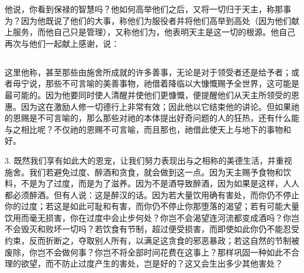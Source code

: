他说，你看到保禄的智慧吗？他如何高举他们之后，又将一切归于天主，称那事为？因为他既说了他们的大事，称他们为服役者并将他们高举到高处（因为他们献上服务，而他自己只是管理），又称他们为，他表明天主是这一切的根源。他自己再次与他们一起献上感谢，说：\par


\subsection{}

\par

这里他称，甚至那些由施舍所成就的许多善事，无论是对于领受者还是给予者；或者毋宁说，那些不可言喻的美善事物，祂借着降临以大慷慨赐予全世界，这可能是最可能的。因为他要同时使人清醒并使他们更慷慨，便提醒他们从天主所领受的恩惠。因为这在激励人修一切德行上非常有效；因此他以它结束他的讲论。但如果祂的恩赐是不可言喻的，那么那些对祂的本体提出好奇问题的人的狂热，还有什么能与之相比呢？不仅祂的恩赐不可言喻，而且那也，祂借此使天上与地下的事物和好。\par

3. 既然我们享有如此大的恩宠，让我们努力表现出与之相称的美德生活，并重视施舍。我们若避免过度、醉酒和贪食，就会做到这一点。因为天主赐予食物和饮料，不是为了过度，而是为了滋养。因为不是酒导致醉酒，因为如果是这样，人人都必须醉酒。但有人说：这是醉汉的话。因为若大量饮用确有害处，而你仍不停止你的过度；若这是如此可耻和有害，而你仍不停止你那堕落的渴望；若有可能大量饮用而毫无损害，你在过度中会止步何处？你岂不会渴望连河流都变成酒吗？你岂不会毁灭和败坏一切吗？若饮食有节制，超过便受损害，而即使如此你仍不能忍受约束，反而折断之，夺取别人所有，以满足这贪食的邪恶暴政；若这自然的节制被废除，你岂不会做何事？你岂不将全部时间花费在这事上？那样巩固一种如此不合理的欲望，而不防止过度产生的害处，岂是好的？这又会生出多少其他害处？\par

